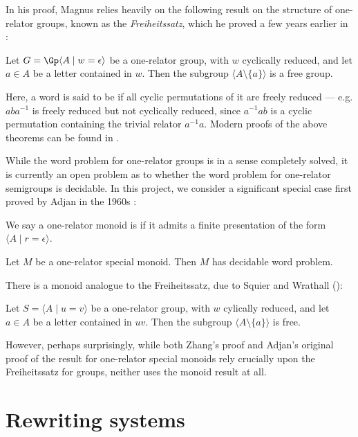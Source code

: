 \documentclass[noindex,noinsetproof,emphthm,12pt]{lmaths}
\begin{document}
In his proof, Magnus relies heavily on the following result on the structure of one-relator groups, known as the \emph{Freiheitssatz}, which he proved a few years earlier in \cite{Magnus1930}:

\begin{theorem}[Freiheitssatz] \label{thm:freiheitssatz}
	Let $G = \Gp \langle A \mid w = \epsilon \rangle$ be a one-relator group, with $w$ cyclically reduced, and let $a \in A$ be a letter contained in $w$. Then the subgroup $\langle A \setminus \{a\} \rangle$ is a free group.
\end{theorem}

Here, a word is said to be  if all cyclic permutations of it are freely reduced --- e.g. $aba^{-1}$ is freely reduced but not cyclically reduced, since $a^{-1}ab$ is a cyclic permutation containing the trivial relator $a^{-1}a$. Modern proofs of the above theorems can be found in \cite{Lyndon2001}.

While the word problem for one-relator groups is in a sense completely solved, it is currently an open problem as to whether the word problem for one-relator semigroups is decidable. In this project, we consider a significant special case first proved by Adjan in the 1960s \cite{Adian1966}:

\begin{defn}
We say a one-relator monoid is  if it admits a finite presentation of the form $\langle A \mid r = \epsilon \rangle$.
\end{defn}

\begin{theorem}[Adjan]
	Let $M$ be a one-relator special monoid. Then $M$ has decidable word problem.
\end{theorem}

There is a monoid analogue to the Freiheitssatz, due to Squier and Wrathall (\cite{Squier1983}):
\begin{theorem}
	Let $S = \langle A \mid u = v \rangle$ be a one-relator group, with $w$ cylically reduced, and let $a \in A$ be a letter contained in $uv$. Then the subgroup $\langle A \setminus \{a\} \rangle$ is free.
\end{theorem}
However, perhaps surprisingly, while both Zhang's proof and Adjan's original proof of the result for one-relator special monoids rely crucially upon the Freiheitssatz for groups, neither uses the monoid result at all.


\section{Rewriting systems} \label{sec:rewriting-systems}
\end{document}
